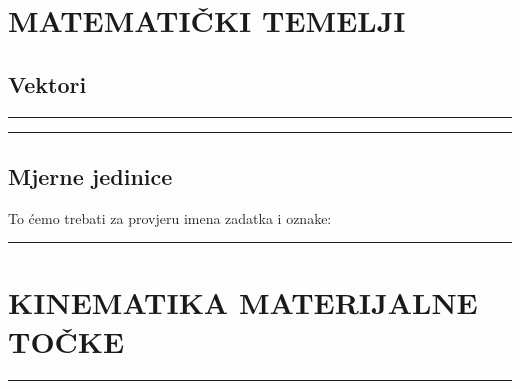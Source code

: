 \documentclass[10pt]{book}
\newcounter{zadatak} %
\newcounter{cjelina}
\begin{document}


\tableofcontents
 
\clearpage


\chapter{MATEMATIČKI TEMELJI}



\section{Vektori}


%

\noindent
{\color{boja} \rule{\linewidth}{0.3mm} }

\vspace{0.8cm}




\noindent
{\color{boja} \rule{\linewidth}{0.3mm} }


\section{Mjerne jedinice}
To ćemo trebati za provjeru imena zadatka i oznake:


\vspace{0.2cm}
\noindent
{\color{boja} \rule{\linewidth}{0.3mm} }


\vspace{0.8cm} 

\newpage
\chapter{KINEMATIKA MATERIJALNE TOČKE}
\setcounter{zadatak}{0}




\noindent
{\color{boja} \rule{\linewidth}{0.3mm} }

\vspace{0.8cm} 
\end{document}
